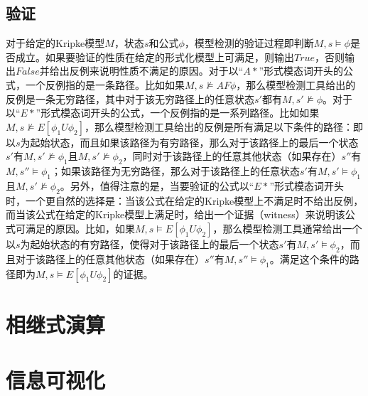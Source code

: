 \subsection{验证}
对于给定的Kripke模型$M$，状态$s$和\CTL{}公式$\phi$，\CTL{}模型检测的验证过程即判断$M,s\models \phi$是否成立。如果要验证的性质在给定的形式化模型上可满足，则输出$True$，否则输出$False$并给出反例来说明性质不满足的原因。对于以“$A*$”形式模态词开头的\CTL{}公式，一个反例指的是一条路径。比如如果$M,s\not\models AF\phi$，那么模型检测工具给出的反例是一条无穷路径，其中对于该无穷路径上的任意状态$s'$都有$M,s'\not\models \phi$。对于以“$E*$”形式模态词开头的\CTL{}公式，一个反例指的是一系列路径。比如如果$M,s\not\models E[\phi_1 U\phi_2]$，那么模型检测工具给出的反例是所有满足以下条件的路径：即以$s$为起始状态，而且如果该路径为有穷路径，那么对于该路径上的最后一个状态$s'$有$M,s'\not\models\phi_1$且$M,s'\not\models\phi_2$，同时对于该路径上的任意其他状态（如果存在）$s''$有$M,s''\models \phi_1$；如果该路径为无穷路径，那么对于该路径上的任意状态$s'$有$M,s'\models \phi_1$且$M,s'\not\models \phi_2$。另外，值得注意的是，当要验证的\CTL{}公式以“$E*$”形式模态词开头时，一个更自然的选择是：当该公式在给定的Kripke模型上不满足时不给出反例，而当该公式在给定的Kripke模型上满足时，给出一个证据（witness）来说明该公式可满足的原因\cite{BaierKatoen08}。比如，如果$M,s\models E[\phi_1 U\phi_2]$，那么模型检测工具通常给出一个以$s$为起始状态的有穷路径，使得对于该路径上的最后一个状态$s'$有$M,s'\models\phi_2$，而且对于该路径上的任意其他状态（如果存在）$s''$有$M,s''\models\phi_1$。满足这个条件的路径即为$M,s\models E[\phi_1 U\phi_2]$的证据。


\section{相继式演算}
\section{信息可视化}